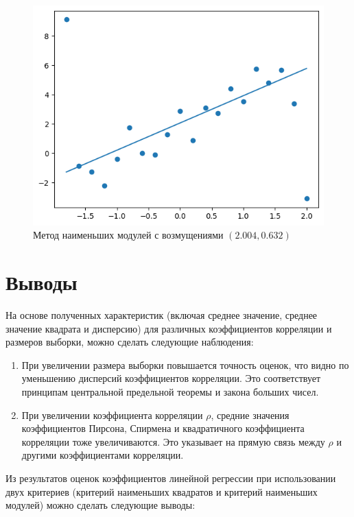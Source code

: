 \documentclass[12pt,a4paper]{article}
\begin{document}
	\begin{figure}[htbp!]
		\begin{center}
			\includegraphics[width = 1\linewidth]{graphics/lab6_sq_mod.png}
			\caption{Метод наименьших модулей с возмущениями \( (2.004, 0.632) \)}
		\end{center}
	\end{figure}

	\clearpage

	\section{Выводы}

	На основе полученных характеристик (включая среднее значение, среднее
	значение квадрата и дисперсию) для различных коэффициентов корреляции и
	размеров выборки, можно сделать следующие наблюдения:

	\begin{enumerate}
		\item При увеличении размера выборки повышается точность оценок, что
		видно по уменьшению дисперсий коэффициентов корреляции. Это
		соответствует принципам центральной предельной теоремы и закона
		больших чисел.
		\item При увеличении коэффициента корреляции \( \rho \), средние
		значения коэффициентов Пирсона, Спирмена и квадратичного коэффициента
		корреляции тоже увеличиваются. Это указывает на прямую связь между
		\( \rho \) и другими коэффициентами корреляции.
	\end{enumerate}

	Из результатов оценок коэффициентов линейной регрессии при использовании
	двух критериев (критерий наименьших квадратов и критерий наименьших
	модулей) можно сделать следующие выводы:
\end{document}
